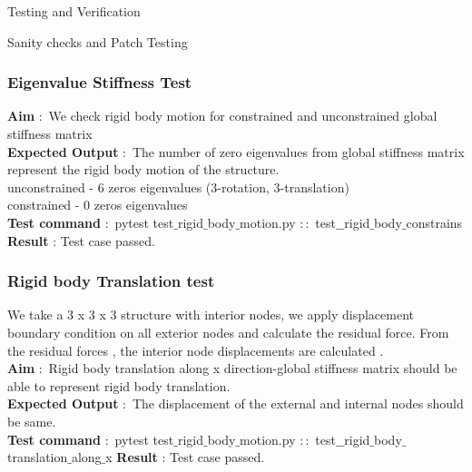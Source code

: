 \documentclass[a4paper,12pt,times]{article}
\begin{document}
\begin{section}{Testing and Verification}
\begin{subsection}{Sanity checks and Patch Testing}
\subsubsection{Eigenvalue Stiffness Test }

\textbf{Aim} $\colon$ We check rigid body motion for constrained and unconstrained global stiffness matrix \citep{patchtest} \\ 
\textbf{Expected Output} $\colon$ The number of zero eigenvalues from global stiffness matrix represent the rigid body motion of the structure.\\
unconstrained - 6 zeros eigenvalues (3-rotation, 3-translation)\\
constrained - 0 zeros eigenvalues \\
\textbf{Test command} $\colon$ pytest test$\_$rigid$\_$body$\_$motion.py $\colon \colon $ test$\_ \_$rigid$\_$body$\_$constrains
\textbf{Result} : Test case passed. 


\subsubsection{Rigid body Translation test }
We take a 3 x 3 x 3 structure with interior nodes, we apply  displacement boundary condition on all exterior nodes and calculate the residual force. From the residual forces , the interior node displacements are calculated .\citep{patchtest}\\
\textbf{Aim} $\colon$ Rigid body translation along x direction-global stiffness matrix should be able to represent rigid body translation. \\ 
\textbf{Expected Output} $\colon$ The displacement of the external and internal nodes should be same.\\
\textbf{Test command} $\colon$ pytest test$\_$rigid$\_$body$\_$motion.py $\colon \colon $ test$\_ \_$rigid$\_$body$\_$translation$\_$along$\_$x
\textbf{Result} : Test case passed. 


\end{subsection}
\end{section}
\end{document}

